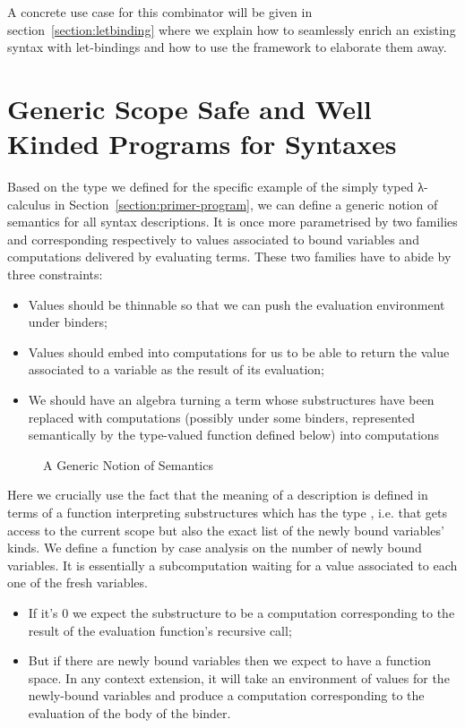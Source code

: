 A concrete use case for this combinator will be given in
section~\ref{section:letbinding}
where we explain how to seamlessly enrich an existing syntax with let-bindings
and how to use the \semrec{} framework to elaborate them away.




\section{Generic Scope Safe and Well Kinded Programs for Syntaxes}\label{section:semantics}

Based on the \semrec{} type we defined for the specific example of the
simply typed λ-calculus in Section~\ref{section:primer-program},
we can define a generic notion of
semantics for all syntax descriptions. It is once more parametrised
by two  families  and  corresponding
respectively to values associated to bound variables and
computations delivered by evaluating terms. These two families
have to abide by three constraints:
\begin{itemize}
\item{} Values should be thinnable so that we can push the
      evaluation environment under binders;
\item{} Values should embed into computations for us to be able
      to return the value associated to a variable as the
      result of its evaluation;
\item{} We should have an algebra turning
      a term whose substructures have been replaced with
      computations (possibly under some binders, represented semantically
      by the  type-valued function defined below) into computations
\end{itemize}

\begin{figure}[h]
\caption{A Generic Notion of Semantics}
\end{figure}

Here we crucially use the fact that the meaning of a description is
defined in terms of a function interpreting substructures which has
the type    , i.e. that gets access
to the current scope but also the exact list of the newly bound variables' kinds.
We define a function  by case analysis on the number of newly bound
variables. It is essentially a subcomputation waiting for a value associated to
each one of the fresh variables.
\begin{itemize}
\item If it's $0$ we expect the substructure to be a computation corresponding
    to the result of the evaluation function's recursive call;
  \item But if there are newly bound variables then we expect to have a function
    space. In any context extension, it will take an environment of values for
    the newly-bound variables and produce a computation corresponding to the
    evaluation of the body of the binder.
\end{itemize}

